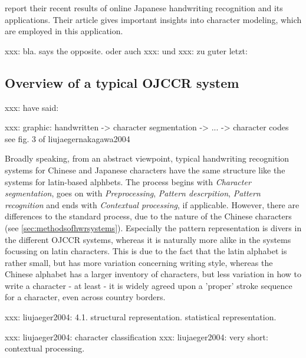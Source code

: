 \cite{Nakagawa2008} report their recent results of online Japanese 
handwriting recognition and its applications. Their article gives 
important insights into character modeling, which are employed in 
this application.

xxx: bla.  says the opposite. \cite{ChenLee1996} oder auch 
xxx: \cite{Nakagawa2008} und \cite{Nakai2003} 
xxx: zu guter letzt: \cite{Santosh2009}

\subsection{Overview of a typical OJCCR system}

xxx:  \cite{LiuJaegerNakagawa2004} have said: 

xxx:  graphic:
handwritten -> character segmentation -> ... -> character codes
see fig. 3 of liujaegernakagawa2004

Broadly speaking, from an abstract viewpoint, typical handwriting recognition 
systems for Chinese and Japanese characters have the same structure like the
systems for latin-based alphbets. The process begins with \emph{Character 
segmentation}, goes on with \emph{Preprocessing}, \emph{Pattern descrpition}, 
\emph{Pattern recognition} and ends with \emph{Contextual processing}, 
if applicable. However, there are differences to the standard process, due to 
the nature of the Chinese characters (see \ref{sec:methodsofhwrsystems}).
Especially the pattern representation is divers in the different OJCCR systems,
whereas it is naturally more alike in the systems focussing on latin characters.
This is due to the fact that the latin alphabet is rather small, but has more
variation concerning writing style, whereas the Chinese alphabet has a larger 
inventory of characters, but less variation in how to write a character - at
least - it is widely agreed upon a 'proper' stroke sequence for a character,
even across country borders.

xxx: liujaeger2004: 4.1. structural representation. statistical representation.

xxx: liujaeger2004: character classification
xxx: liujaeger2004: very short: contextual processing.




